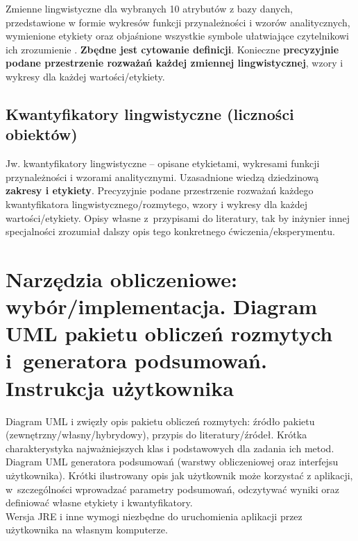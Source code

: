 \documentclass{classrep}
\begin{document}
Zmienne lingwistyczne dla wybranych 10 atrybutów z bazy danych, przedstawione w
formie wykresów funkcji przynależności i wzorów analitycznych, wymienione etykiety oraz objaśnione wszystkie
symbole ułatwiające czytelnikowi ich zrozumienie \cite{zadrozny06}. {\bf Zbędne jest
cytowanie definicji}. Konieczne {\bf precyzyjnie podane przestrzenie rozważań każdej
zmiennej lingwistycznej}, wzory i wykresy dla każdej wartości/etykiety.

\subsection{Kwantyfikatory lingwistyczne (liczności obiektów)}
Jw. kwantyfikatory lingwistyczne -- opisane etykietami, wykresami funkcji
przynależności i wzorami analitycznymi. Uzasadnione wiedzą dziedzinową  
{\bf zakresy i etykiety}. Precyzyjnie podane przestrzenie rozważań każdego kwantyfikatora 
lingwistycznego/rozmytego, wzory i wykresy dla każdej wartości/etykiety. Opisy własne z~przypisami do literatury, tak by inżynier innej specjalności zrozumiał dalszy
opis tego konkretnego ćwiczenia/eksperymentu.  


\section{Narzędzia obliczeniowe: wybór/implementacja. Diagram UML pakietu
obliczeń rozmytych i~generatora podsumowań. Instrukcja użytkownika}

Diagram UML i zwięzły opis pakietu obliczeń rozmytych: źródło pakietu
(zewnętrzny/własny/hybrydowy), przypis do literatury/źródeł. Krótka charakterystyka
najważniejszych klas i podstawowych dla zadania ich metod. \\

Diagram UML generatora podsumowań (warstwy obliczeniowej oraz interfejsu
użytkownika). Krótki ilustrowany opis jak użytkownik może korzystać z aplikacji, w~szczególności
wprowadzać parametry  podsumowań, odczytywać wyniki oraz definiować własne etykiety i
kwantyfikatory.\\

Wersja JRE i inne wymogi niezbędne do uruchomienia aplikacji przez użytkownika na własnym komputerze. 
\end{document}
